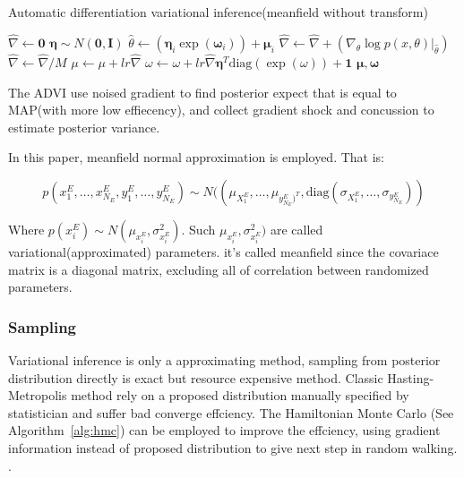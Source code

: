 \documentclass{article}
\begin{document}
\begin{algorithm}
\caption{Automatic differentiation variational inference(meanfield without transform)}
\begin{algorithmic}[1]
  
        \State $\hat{\nabla} \gets \mathbf{0}$
        \State $\mathbf{\eta} \sim N(\mathbf{0},\mathbf{I}) $ 
            \State $\hat{\theta} \gets (\mathbf{\eta}_i \exp(\mathbf{\omega}_i)) + \mathbf{\mu}_i$
            \State $\hat{\nabla} \gets \hat{\nabla} + (\nabla_\theta \log p(x,\theta)|_{\hat{\theta}})$
        \EndFor
        \State $\hat{\nabla} \gets \hat{\nabla} / M$
        \State $\mu \gets \mu + lr \hat{\nabla}$
        \State $\omega \gets \omega + lr \hat{\nabla} \mathbf{\eta}^T \mathrm{diag}({\exp(\omega)}) + \mathbf{1}$
    \EndFor 
    \State \Return $\mathbf{\mu},\mathbf{\omega}$
\EndProcedure
\end{algorithmic}
\label{alg:advi}
\end{algorithm}

The ADVI use noised gradient to find posterior expect that is equal to MAP(with more low effiecency),
 and collect gradient shock and concussion to estimate posterior variance.
 
In this paper, meanfield normal approximation is employed. That is:

$$
p(x^E_1,\dots,x^E_{N_E},y^E_1,\dots,y^E_{N_E}) \sim 
N((\mu_{X^E_1},\dots,\mu_{y^E_{N_E})^T},\mathrm{diag}(\sigma_{X^E_1},\dots,\sigma_{y^E_{N_E}}))
$$

Where $p(x^E_i) \sim N(\mu_{x^E_i},\sigma_{x^E_i}^2)$. 
Such $\mu_{x^E_i},\sigma_{x^E_i}^2)$ are called variational(approximated) parameters. 
it's called meanfield since the covariace matrix is a diagonal matrix, 
excluding all of correlation between randomized parameters.

\subsubsection{Sampling}

Variational inference is only a approximating method, 
sampling from posterior distribution directly is exact but resource expensive method. 
Classic Hasting-Metropolis method rely on a proposed distribution manually specified by statistician
and suffer bad converge effciency. 
The Hamiltonian Monte Carlo \cite{hoffman2014no} (See Algorithm~\ref{alg:hmc}) can be employed to improve the effciency,
using gradient information instead of proposed distribution to give next step in random walking. .
\end{document}
